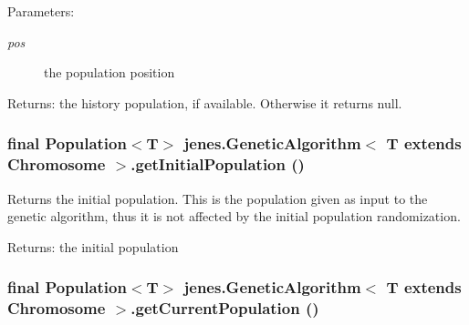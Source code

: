 \begin{Desc}
\item[Parameters:]
\begin{description}
\item[{\em pos}]the population position \end{description}
\end{Desc}
\begin{Desc}
\item[Returns:]the history population, if available. Otherwise it returns null. \end{Desc}
\hypertarget{classjenes_1_1_genetic_algorithm_3_01_t_01extends_01_chromosome_01_4_b5ff704fa1d7b01bcfc5f0ca36b20e34}{
\subsubsection[getInitialPopulation]{\setlength{\rightskip}{0pt plus 5cm}final Population$<$T$>$ jenes.GeneticAlgorithm$<$ T extends Chromosome $>$.getInitialPopulation ()}}
\label{classjenes_1_1_genetic_algorithm_3_01_t_01extends_01_chromosome_01_4_b5ff704fa1d7b01bcfc5f0ca36b20e34}


Returns the initial population. This is the population given as input to the genetic algorithm, thus it is not affected by the initial population randomization. 

\begin{Desc}
\item[Returns:]the initial population \end{Desc}
\hypertarget{classjenes_1_1_genetic_algorithm_3_01_t_01extends_01_chromosome_01_4_855bc56ffb3e1704ced2fdf68cc96d8f}{
\subsubsection[getCurrentPopulation]{\setlength{\rightskip}{0pt plus 5cm}final Population$<$T$>$ jenes.GeneticAlgorithm$<$ T extends Chromosome $>$.getCurrentPopulation ()}}
\label{classjenes_1_1_genetic_algorithm_3_01_t_01extends_01_chromosome_01_4_855bc56ffb3e1704ced2fdf68cc96d8f}


